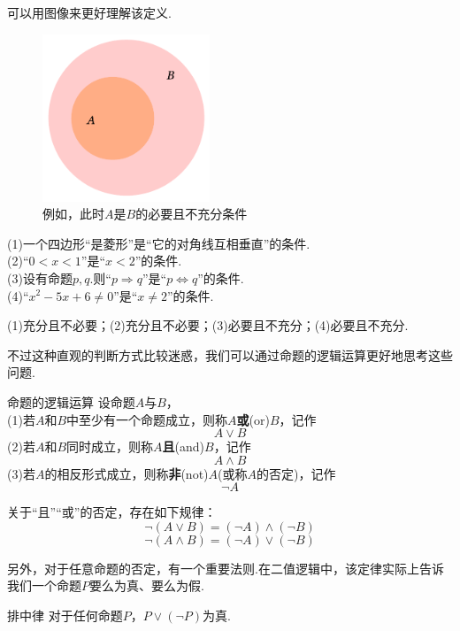 \documentclass[lang=cn, zihao=4.5]{elegantbook}
\newcommand{\tk}{\uline{\hspace{4em}}}
\begin{document}
可以用图像来更好理解该定义.

\begin{figure}[h!]
	\centering
	\includegraphics[width=5cm]{attachment/202302191.pdf}
	\caption{例如，此时$A$是$B$的必要且不充分条件}
\end{figure}

\begin{example}
	(1)一个四边形“是菱形”是“它的对角线互相垂直”的\tk 条件. \\
	(2)“$0<x<1$”是“$x<2$”的\tk 条件. \\
	(3)设有命题$p,q$.则“$p \Rightarrow q$”是“$p \Leftrightarrow q$”的\tk 条件. \\
	(4)“$x^2-5x+6 \neq 0$”是“$x \neq 2$”的\tk 条件.
\end{example}
\begin{solution}
	(1)充分且不必要；(2)充分且不必要；(3)必要且不充分；(4)必要且不充分.
\end{solution}

不过这种直观的判断方式比较迷惑，我们可以通过命题的逻辑运算更好地思考这些问题.

\begin{definition}{命题的逻辑运算} %
	设命题$A$与$B$， \\
	(1)若$A$和$B$中至少有一个命题成立，则称$A$\textbf{或}(or)$B$，记作$$A \vee B$$
	(2)若$A$和$B$同时成立，则称$A$\textbf{且}(and)$B$，记作$$A \wedge B$$
	(3)若$A$的相反形式成立，则称\textbf{非}(not)$A$(或称$A$的否定)，记作$$\neg A$$
\end{definition}
\begin{remark}
	关于“且”“或”的否定，存在如下规律：
	$$\neg (A \vee B) = (\neg A) \wedge (\neg B)$$
	$$\neg (A \wedge B) = (\neg A) \vee (\neg B)$$
\end{remark}

另外，对于任意命题的否定，有一个重要法则.在二值逻辑中，该定律实际上告诉我们一个命题$P$要么为真、要么为假.

\begin{proposition}{排中律}
	对于任何命题$P$，$P \vee (\neg P)$为真.
\end{proposition}
\end{document}
